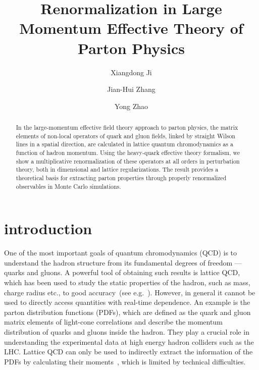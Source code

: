 \documentclass[prd,aps,twocolumn,preprintnumbers, showpacs, nofootinbib,superscriptaddress,notitlepage]{revtex4-1}
\begin{document}
\title{Renormalization in Large Momentum Effective Theory of Parton Physics}

\author{Xiangdong Ji}

\author{Jian-Hui Zhang}

\author{Yong Zhao}


\begin{abstract}

In the large-momentum effective field theory approach to parton physics,
the matrix elements of non-local operators of quark and gluon fields, linked by straight
Wilson lines in 
a spatial direction, are calculated in lattice quantum chromodynamics as a function of hadron momentum.
Using the heavy-quark effective theory formalism, we show a multiplicative renormalization
of these operators at all orders in perturbation theory, both in dimensional and lattice
regularizations. The result provides a theoretical basis for
extracting parton properties through properly renormalized observables
in Monte Carlo simulations.

\end{abstract}

\maketitle

\section{introduction}

One of the most important goals of quantum chromodynamics (QCD) is to understand the hadron structure from its fundamental degrees of freedom --- quarks and gluons.
A powerful tool of obtaining such results is lattice QCD, which has been used to study the static properties of the hadron, such as mass, charge radius etc., to good accuracy~(see e.g.~\cite{Edwards:2012fx,Aoki:2016frl}). However, in general it cannot be used to directly access quantities with real-time dependence. An example is the parton distribution functions (PDFs), which are defined as the quark and gluon matrix elements of light-cone correlations and describe the momentum distribution of quarks and gluons inside the hadron. They play a crucial role in understanding the experimental data at high energy hadron colliders such as the LHC. Lattice QCD can only be used to indirectly extract the information of the PDFs by calculating their moments~\cite{Detmold:2001jb,Dolgov:2002zm}, which is limited by technical difficulties. 
\end{document}

